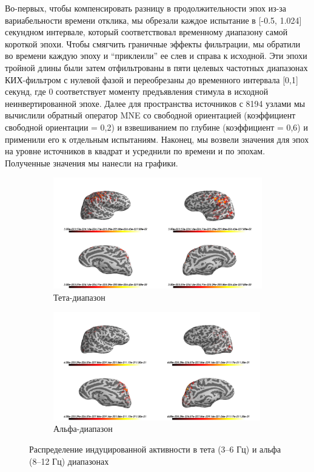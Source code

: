 Во-первых, чтобы компенсировать разницу в продолжительности эпох из-за
вариабельности времени отклика, мы обрезали каждое испытание в [-0.5, 1.024] секундном
интервале, который соответствовал временному диапазону самой короткой эпохи.
Чтобы смягчить граничные эффекты фильтрации, мы
обратили во времени каждую эпоху и ``приклеили'' ее слев и справа к исходной.
Эти эпохи тройной длины были затем отфильтрованы
в пяти целевых частотных диапазонах КИХ-фильтром с нулевой фазой и переобрезаны
до временного интервала [0,1] секунд, где 0 соответствует моменту предъявления стимула в
исходной неинвертированной эпохе. Далее для пространства источников с 8194
узлами мы вычислили обратный оператор MNE со свободной ориентацией
(коэффициент свободной ориентации = 0,2) и взвешиванием по глубине (коэффициент = 0,6)
и применили его к отдельным испытаниям. Наконец, мы возвели значения для эпох на уровне источников в квадрат и усреднили по времени и по эпохам.
Полученные значения мы нанесли на графики.

\begin{figure}
      \begin{subfigure}[b]{0.5\textwidth}
        \includegraphics[width=\textwidth]{../images/psiicos_paper/Figure16a_hr.jpg}
        \caption{Тета-диапазон}\label{fig:theta_pwr}
      \end{subfigure}
      \begin{subfigure}[b]{0.5\textwidth}
        \includegraphics[width=0.99\textwidth]{../images/psiicos_paper/Figure16b_hr.jpg}
        \caption{Альфа-диапазон}\label{fig:alpha_pwr}
      \end{subfigure}
      \caption{Распределение индуцированной активности в тета (3--6 Гц) и альфа (8--12 Гц) диапазонах}\label{fig:theta_alpha_pwr}
\end{figure} %

